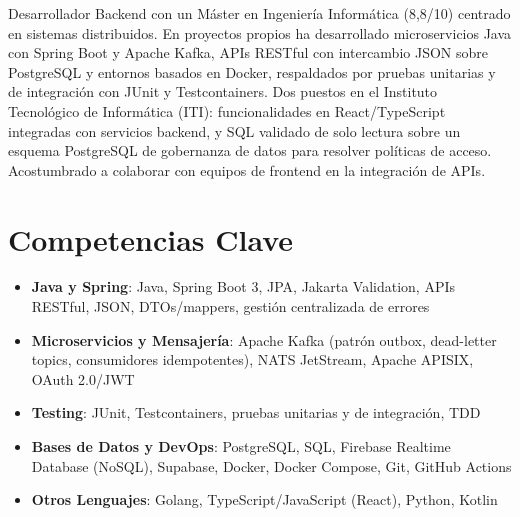 \documentclass[11pt,a4paper,sans]{moderncv}
\begin{document}
\makecvtitle


\vspace{6pt}
\small{Desarrollador Backend con un Máster en Ingeniería Informática (8,8/10) centrado en sistemas distribuidos. En proyectos propios ha desarrollado microservicios Java con Spring Boot y Apache Kafka, APIs RESTful con intercambio JSON sobre PostgreSQL y entornos basados en Docker, respaldados por pruebas unitarias y de integración con JUnit y Testcontainers. Dos puestos en el Instituto Tecnológico de Informática (ITI): funcionalidades en React/TypeScript integradas con servicios backend, y SQL validado de solo lectura sobre un esquema PostgreSQL de gobernanza de datos para resolver políticas de acceso. Acostumbrado a colaborar con equipos de frontend en la integración de APIs.}


\section{Competencias Clave}
\vspace{1pt}
\begin{itemize}

\item \textbf{Java y Spring}: Java, Spring Boot 3, JPA, Jakarta Validation, APIs RESTful, JSON, DTOs/mappers, gestión centralizada de errores

\item \textbf{Microservicios y Mensajería}: Apache Kafka (patrón outbox, dead-letter topics, consumidores idempotentes), NATS JetStream, Apache APISIX, OAuth 2.0/JWT

\item \textbf{Testing}: JUnit, Testcontainers, pruebas unitarias y de integración, TDD

\item \textbf{Bases de Datos y DevOps}: PostgreSQL, SQL, Firebase Realtime Database (NoSQL), Supabase, Docker, Docker Compose, Git, GitHub Actions

\item \textbf{Otros Lenguajes}: Golang, TypeScript/JavaScript (React), Python, Kotlin

\end{itemize}
\end{document}
